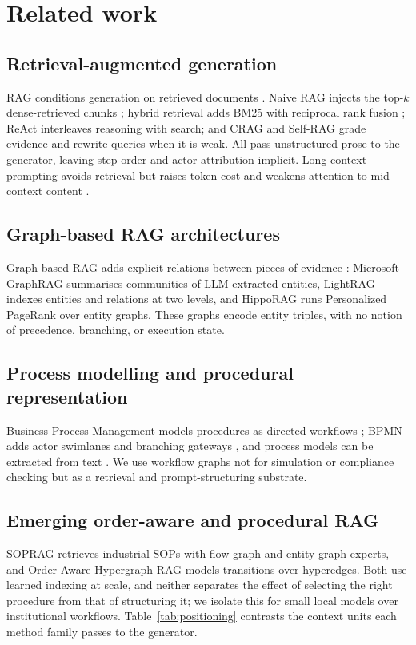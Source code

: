 \documentclass[preprint,10pt]{elsarticle}
\begin{document}
\section{Related work}
\label{sec:related}

\subsection{Retrieval-augmented generation}
RAG conditions generation on retrieved documents \cite{lewis2020rag}. Naive RAG injects the top-$k$ dense-retrieved chunks \cite{gao2023ragsurvey}; hybrid retrieval adds BM25 \cite{robertson2009bm25} with reciprocal rank fusion \cite{cormack2009rrf}; ReAct \cite{yao2023react} interleaves reasoning with search; and CRAG \cite{yan2024crag} and Self-RAG \cite{asai2024selfrag} grade evidence and rewrite queries when it is weak. All pass unstructured prose to the generator, leaving step order and actor attribution implicit. Long-context prompting avoids retrieval but raises token cost and weakens attention to mid-context content \cite{liu2024lost}.

\subsection{Graph-based RAG architectures}
Graph-based RAG adds explicit relations between pieces of evidence \cite{peng2024graphragsurvey,pan2024unifying}: Microsoft GraphRAG \cite{edge2024graphrag} summarises communities of LLM-extracted entities, LightRAG \cite{guo2024lightrag} indexes entities and relations at two levels, and HippoRAG \cite{gutierrez2024hipporag} runs Personalized PageRank over entity graphs. These graphs encode entity triples, with no notion of precedence, branching, or execution state.

\subsection{Process modelling and procedural representation}
Business Process Management models procedures as directed workflows \cite{dumas2018fundamentals}; BPMN adds actor swimlanes and branching gateways \cite{omg2011bpmn}, and process models can be extracted from text \cite{friedrich2011process}. We use workflow graphs not for simulation or compliance checking but as a retrieval and prompt-structuring substrate.

\subsection{Emerging order-aware and procedural RAG}
SOPRAG \cite{lin2026sedrag} retrieves industrial SOPs with flow-graph and entity-graph experts, and Order-Aware Hypergraph RAG \cite{wu2026okhrag} models transitions over hyperedges. Both use learned indexing at scale, and neither separates the effect of selecting the right procedure from that of structuring it; we isolate this for small local models over institutional workflows. Table~\ref{tab:positioning} contrasts the context units each method family passes to the generator.
\end{document}

